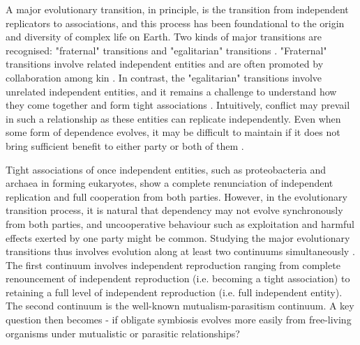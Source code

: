 \documentclass[11pt]{article}
\begin{document}


A major evolutionary transition, in principle, is the transition from independent replicators to associations, and this process has been foundational to the origin and diversity of complex life on Earth.
Two kinds of major transitions are recognised: "fraternal" transitions and "egalitarian" transitions \citep{queller:PTRSB:2000} . 
"Fraternal" transitions involve related independent entities and are often promoted by collaboration among kin \citep{nowak:Nature:2010}.
In contrast, the "egalitarian" transitions involve unrelated independent entities, and it remains a challenge to understand how they come together and form tight associations \citep{tarnita:JTB:2013}.
Intuitively, conflict may prevail in such a relationship as these entities can replicate independently.
Even when some form of dependence evolves, it may be difficult to maintain if it does not bring sufficient benefit to either party or both of them \citep{athreya:AmNat:2025}.

Tight associations of once independent entities, such as proteobacteria and archaea in forming eukaryotes, show a complete renunciation of independent replication and full cooperation from both parties.
However, in the evolutionary transition process, it is natural that dependency may not evolve synchronously from both parties, and uncooperative behaviour such as exploitation and harmful effects exerted by one party might be common.
Studying the major evolutionary transitions thus involves evolution along at least two continuums simultaneously \citep{estrela:COM:2016} . 
The first continuum involves independent reproduction ranging from complete renouncement of independent reproduction (i.e. becoming a tight association) to retaining a full level of independent reproduction (i.e. full independent entity).
The second continuum is the well-known mutualism-parasitism continuum.
A key question then becomes - if obligate symbiosis evolves more easily from free-living organisms under mutualistic or parasitic relationships? 
\end{document}
